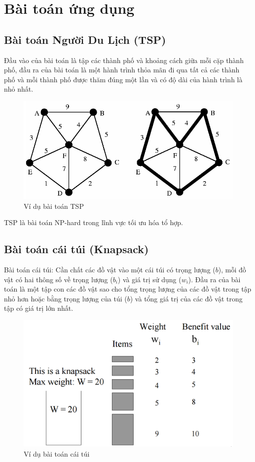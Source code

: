 \documentclass[a4paper,12pt]{report}
\begin{document}
\section{Bài toán ứng dụng}
\subsection{Bài toán Người Du Lịch (TSP)}
Đầu vào của bài toán là tập các thành phố và khoảng cách giữa mỗi cặp thành phố, đầu ra của bài toán là một hành trình thỏa mãn đi qua tất cả các thành phố và mỗi thành phố được thăm đúng một lần và có độ dài của hành trình là nhỏ nhất.\\

\begin{figure}[H]
\center
\includegraphics[scale=0.5]{TSP_example.PNG}
\caption{Ví dụ bài toán TSP}
\end{figure}

TSP là bài toán NP-hard trong lĩnh vực tối ưu hóa tổ hợp.
\subsection{Bài toán cái túi (Knapsack)}
Bài toán cái túi: Cần chất các đồ vật vào một cái túi có trọng lượng ($b$), mỗi đồ vật có hai thông số về trọng lượng ($b_i$) và giá trị sử dụng ($w_i$). Đầu ra của bài toán là một tập con các đồ vật sao cho tổng trọng lượng của các đồ vật trong tập nhỏ hơn hoặc bằng trọng lượng của túi ($b$) và tổng giá trị của các đồ vật trong tập có giá trị lớn nhất.
\begin{figure}[H]
\center
\includegraphics[scale=0.5]{KP_example.PNG}
\caption{Ví dụ bài toán cái túi}
\end{figure}
\end{document}
